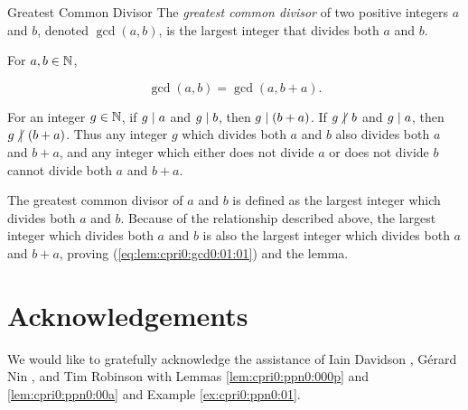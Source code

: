 \begin{vworkdefinitionstatementpar}{Greatest Common Divisor}
\label{def:cpri0:gcd0:01}
The \emph{greatest common divisor} of two positive integers 
$a$ and $b$, denoted $\gcd(a,b)$, is the largest integer
that divides both $a$ and $b$.
\end{vworkdefinitionstatementpar}

\begin{vworklemmastatement}
\label{lem:cpri0:gcd0:01}
For $a,b \in {\mathbb{N}}$,

\begin{equation}
\label{eq:lem:cpri0:gcd0:01:01}
\gcd(a,b) = \gcd(a, b + a). 
\end{equation}
\end{vworklemmastatement}
\begin{vworklemmaproof}
For an integer $g \in {\mathbb{N}}$, if 
$g \mid a$ and $g \mid b$, then
$g \mid (b+a)$.  If $g \hspace{-0.125em}\not\hspace{0.245em}\mid\hspace{0.135em} b$
and $g \mid a$, then $g \hspace{-0.125em}\not\hspace{0.245em}\mid\hspace{0.135em} (b+a)$.
Thus any integer
$g$ which divides both $a$ and $b$ also divides both
$a$ and $b+a$, and any integer which either does not
divide $a$ or does not divide $b$ cannot divide
both $a$ and $b+a$.

The greatest common divisor of $a$ and $b$ is defined as the 
largest integer which divides both $a$ and $b$.  Because of 
the relationship described above, the largest integer which 
divides both $a$ and $b$ is also the largest integer which
divides both $a$ and $b+a$, proving 
(\ref{eq:lem:cpri0:gcd0:01:01}) and the lemma.
\end{vworklemmaproof}
\vworklemmafooter{}




\section{Acknowledgements}

We would like to gratefully acknowledge the assistance of 
Iain Davidson \cite{bibref:i:iaindavidson},
G\'erard Nin \cite{bibref:i:gerardnin},
and Tim Robinson \cite{bibref:i:timrobinson}
with Lemmas \ref{lem:cpri0:ppn0:000p} and \ref{lem:cpri0:ppn0:00a}
and Example \ref{ex:cpri0:ppn0:01}.


